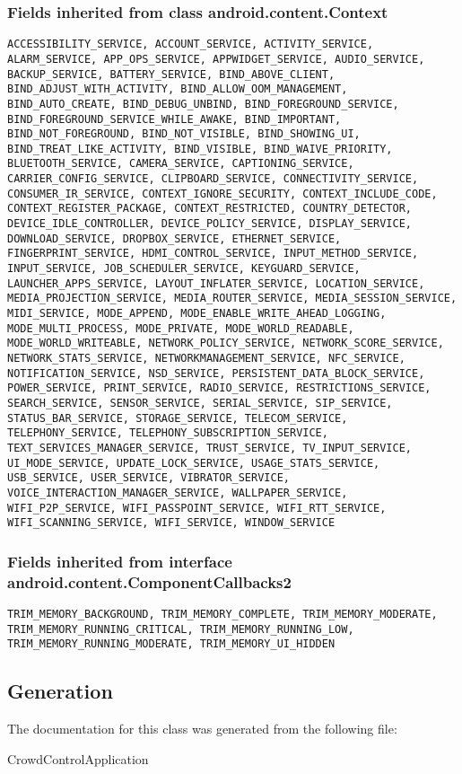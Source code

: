 \subsubsection{Fields inherited from class android.content.Context}
\begin{lstlisting}
ACCESSIBILITY_SERVICE, ACCOUNT_SERVICE, ACTIVITY_SERVICE, ALARM_SERVICE, APP_OPS_SERVICE, APPWIDGET_SERVICE, AUDIO_SERVICE, BACKUP_SERVICE, BATTERY_SERVICE, BIND_ABOVE_CLIENT, BIND_ADJUST_WITH_ACTIVITY, BIND_ALLOW_OOM_MANAGEMENT, BIND_AUTO_CREATE, BIND_DEBUG_UNBIND, BIND_FOREGROUND_SERVICE, BIND_FOREGROUND_SERVICE_WHILE_AWAKE, BIND_IMPORTANT, BIND_NOT_FOREGROUND, BIND_NOT_VISIBLE, BIND_SHOWING_UI, BIND_TREAT_LIKE_ACTIVITY, BIND_VISIBLE, BIND_WAIVE_PRIORITY, BLUETOOTH_SERVICE, CAMERA_SERVICE, CAPTIONING_SERVICE, CARRIER_CONFIG_SERVICE, CLIPBOARD_SERVICE, CONNECTIVITY_SERVICE, CONSUMER_IR_SERVICE, CONTEXT_IGNORE_SECURITY, CONTEXT_INCLUDE_CODE, CONTEXT_REGISTER_PACKAGE, CONTEXT_RESTRICTED, COUNTRY_DETECTOR, DEVICE_IDLE_CONTROLLER, DEVICE_POLICY_SERVICE, DISPLAY_SERVICE, DOWNLOAD_SERVICE, DROPBOX_SERVICE, ETHERNET_SERVICE, FINGERPRINT_SERVICE, HDMI_CONTROL_SERVICE, INPUT_METHOD_SERVICE, INPUT_SERVICE, JOB_SCHEDULER_SERVICE, KEYGUARD_SERVICE, LAUNCHER_APPS_SERVICE, LAYOUT_INFLATER_SERVICE, LOCATION_SERVICE, MEDIA_PROJECTION_SERVICE, MEDIA_ROUTER_SERVICE, MEDIA_SESSION_SERVICE, MIDI_SERVICE, MODE_APPEND, MODE_ENABLE_WRITE_AHEAD_LOGGING, MODE_MULTI_PROCESS, MODE_PRIVATE, MODE_WORLD_READABLE, MODE_WORLD_WRITEABLE, NETWORK_POLICY_SERVICE, NETWORK_SCORE_SERVICE, NETWORK_STATS_SERVICE, NETWORKMANAGEMENT_SERVICE, NFC_SERVICE, NOTIFICATION_SERVICE, NSD_SERVICE, PERSISTENT_DATA_BLOCK_SERVICE, POWER_SERVICE, PRINT_SERVICE, RADIO_SERVICE, RESTRICTIONS_SERVICE, SEARCH_SERVICE, SENSOR_SERVICE, SERIAL_SERVICE, SIP_SERVICE, STATUS_BAR_SERVICE, STORAGE_SERVICE, TELECOM_SERVICE, TELEPHONY_SERVICE, TELEPHONY_SUBSCRIPTION_SERVICE, TEXT_SERVICES_MANAGER_SERVICE, TRUST_SERVICE, TV_INPUT_SERVICE, UI_MODE_SERVICE, UPDATE_LOCK_SERVICE, USAGE_STATS_SERVICE, USB_SERVICE, USER_SERVICE, VIBRATOR_SERVICE, VOICE_INTERACTION_MANAGER_SERVICE, WALLPAPER_SERVICE, WIFI_P2P_SERVICE, WIFI_PASSPOINT_SERVICE, WIFI_RTT_SERVICE, WIFI_SCANNING_SERVICE, WIFI_SERVICE, WINDOW_SERVICE
\end{lstlisting}

\subsubsection{Fields inherited from interface android.content.ComponentCallbacks2}
\begin{lstlisting}
TRIM_MEMORY_BACKGROUND, TRIM_MEMORY_COMPLETE, TRIM_MEMORY_MODERATE, TRIM_MEMORY_RUNNING_CRITICAL, TRIM_MEMORY_RUNNING_LOW, TRIM_MEMORY_RUNNING_MODERATE, TRIM_MEMORY_UI_HIDDEN
\end{lstlisting}


\subsection{Generation}
The documentation for this class was generated from the following file\-:
\begin{DoxyCompactItemize}
\item CrowdControlApplication
\end{DoxyCompactItemize} 










